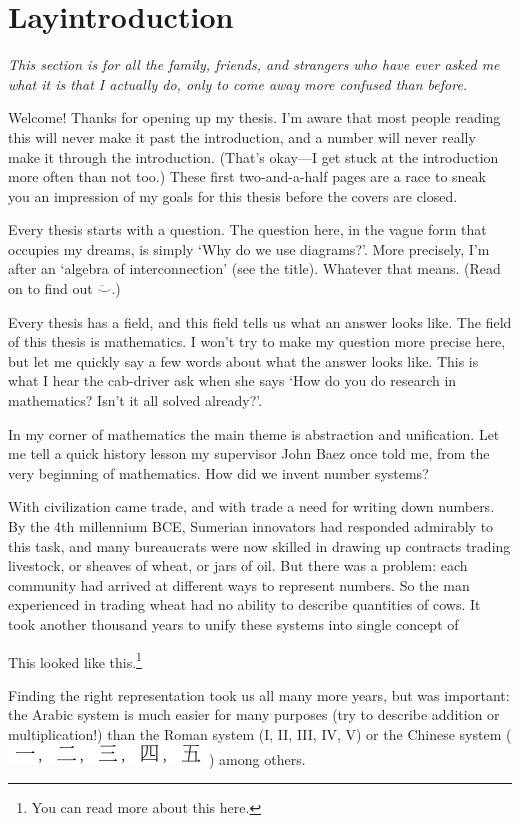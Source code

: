 {}
\chapter*{Layintroduction}

\textit{This section is for all the family, friends, and strangers who have ever
asked me what it is that I actually do, only to come away more confused than
before.}

Welcome! Thanks for opening up my thesis. I'm aware that most people reading
this will never make it past the introduction, and a number will never really
make it through the introduction. (That's okay---I get stuck at the introduction
more often than not too.) These first two-and-a-half pages are a race to sneak
you an impression of my goals for this thesis before the covers are closed. 

Every thesis starts with a question. The question here, in the vague form that
occupies my dreams, is simply `Why do we use diagrams?'. More precisely, I'm
after an `algebra of interconnection' (see the title). Whatever that means.
(Read on to find out $\ddot\smile$.)

Every thesis has a field, and this field tells us what an answer looks like. The
field of this thesis is mathematics. I won't try to make my question more
precise here, but let me quickly say a few words about what the answer looks
like. This is what I hear the cab-driver ask when she says `How do you do
research in mathematics? Isn't it all solved already?'.

In my corner of mathematics the main theme is abstraction and unification. Let
me tell a quick history lesson my supervisor John Baez once told me, from the
very beginning of mathematics. How did we invent number systems?

With civilization came trade, and with trade a need for writing down numbers.
By the 4th millennium BCE, Sumerian innovators had responded admirably to this
task, and many bureaucrats were now skilled in drawing up contracts trading
livestock, or sheaves of wheat, or jars of oil. But there was a problem: each
community had arrived at different ways to represent numbers. So the man
experienced in trading wheat had no ability to describe quantities of cows. It
took another thousand years to unify these systems into single concept of 

This looked like this.\footnote{You can read more about this here.}

Finding the right representation took us all many more years, but was important:
the Arabic system is much easier for many purposes (try to describe addition or
multiplication!) than the Roman system (I, II, III, IV, V) or the Chinese system
(\includegraphics{pics/chinesenumerals}) among others.

